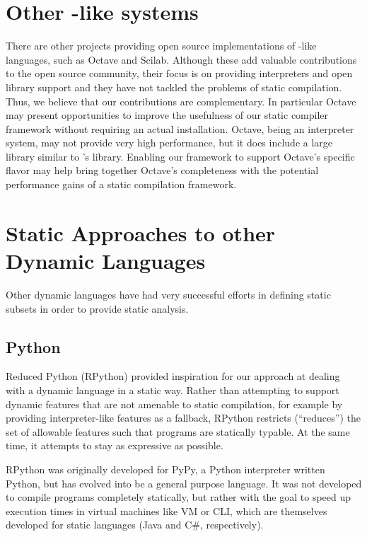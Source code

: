 \section{Other \matlab-like systems}

There are other projects providing open source implementations of \matlab-like
languages, such as Octave\cite{Octave} and Scilab\cite{Scilab}.   Although
these add valuable contributions to the open source community,  
their focus is on providing interpreters and open library support and they have
not tackled the problems of static compilation.   Thus, we believe that our
contributions are complementary. In particular Octave may present opportunities
to improve the usefulness of our static compiler framework without requiring
an actual \matlab installation.
 Octave, being an interpreter system, may not provide very high
performance, but it does include a large library similar to \matlab's
library. Enabling our framework to support Octave's specific \matlab flavor
may help bring together Octave's completeness with the potential performance
gains of a static compilation framework.


\section{Static Approaches to other Dynamic Languages}
\label{sec:otherStatic}

Other dynamic languages have had very successful efforts in defining
static subsets in order to provide static analysis.

\subsection{Python}

Reduced Python (RPython)\cite{RPython} provided inspiration for our
approach at dealing with a dynamic language in a static way. Rather
than attempting to support dynamic features that are not amenable to
static compilation, for example by providing interpreter-like features
as a fallback, RPython restricts (``reduces'') the set of allowable features such
that programs are statically typable. At the same time, it attempts to
stay as expressive as possible.

RPython was originally developed for PyPy, a Python interpreter written  Python,
but has evolved into be a general purpose language.
It was not developed to compile programs completely statically,
but rather with the goal to speed up execution times in 
virtual machines like VM or CLI, which are themselves developed
for static languages (Java and C\#, respectively).

